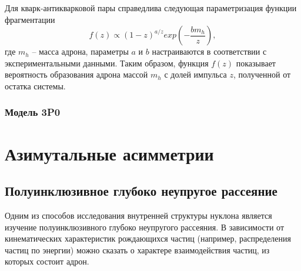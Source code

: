 \documentclass{extarticle}
\begin{document}
Для кварк-антикварковой пары справедлива следующая параметризация функции фрагментации
\begin{equation}
	f(z) \propto (1-z)^{a/z} exp(- \frac{b m_h}{z}),
\end{equation}
где $m_h$ – масса адрона, параметры $a$ и $b$ настраиваются в соответствии с экспериментальными данными. Таким образом, функция $f(z)$ показывает вероятность образования адрона массой $m_h$ с долей импульса $z$, полученной от остатка системы.
\subsubsection{Модель 3P0}
\newpage
\section{Азимутальные асимметрии}
\subsection{Полуинклюзивное глубоко неупругое рассеяние}
Одним из способов исследования внутренней структуры нуклона является изучение полуинклюзивного глубоко неупругого рассеяния. В зависимости от кинематических характеристик рождающихся частиц (например, распределения частиц по энергии) можно сказать о характере взаимодействия частиц, из которых состоит адрон. 
\end{document}
